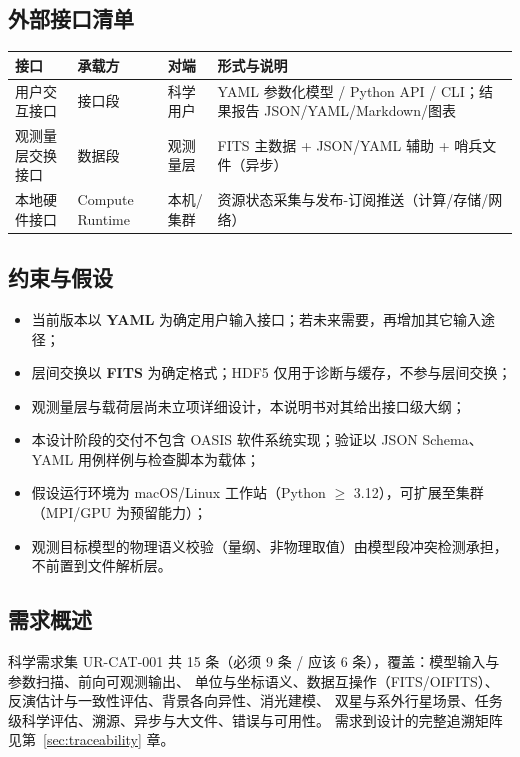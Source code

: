 \subsection{外部接口清单}

\begin{center}
\begin{tabular}{p{3.2cm}p{2.2cm}p{2.8cm}p{6.4cm}}
\toprule
接口 & 承载方 & 对端 & 形式与说明 \\
\midrule
用户交互接口 & 接口段 & 科学用户 & YAML 参数化模型 / Python API / CLI；结果报告 JSON/YAML/Markdown/图表 \\
观测量层交换接口 & 数据段 & 观测量层 & FITS 主数据 + JSON/YAML 辅助 + 哨兵文件（异步） \\
本地硬件接口 & Compute Runtime & 本机/集群 & 资源状态采集与发布-订阅推送（计算/存储/网络） \\
\bottomrule
\end{tabular}
\end{center}

\subsection{约束与假设}
\label{sec:constraints}

\begin{itemize}
  \item 当前版本以 \textbf{YAML} 为确定用户输入接口；若未来需要，再增加其它输入途径；
  \item 层间交换以 \textbf{FITS} 为确定格式；HDF5 仅用于诊断与缓存，不参与层间交换；
  \item 观测量层与载荷层尚未立项详细设计，本说明书对其给出接口级大纲；
  \item 本设计阶段的交付不包含 OASIS 软件系统实现；验证以 JSON Schema、YAML 用例样例与检查脚本为载体；
  \item 假设运行环境为 macOS/Linux 工作站（Python $\geq$ 3.12），可扩展至集群（MPI/GPU 为预留能力）；
  \item 观测目标模型的物理语义校验（量纲、非物理取值）由模型段冲突检测承担，不前置到文件解析层。
\end{itemize}

\subsection{需求概述}

科学需求集 UR-CAT-001 共 15 条（必须 9 条 / 应该 6 条），覆盖：模型输入与参数扫描、前向可观测输出、
单位与坐标语义、数据互操作（FITS/OIFITS）、反演估计与一致性评估、背景各向异性、消光建模、
双星与系外行星场景、任务级科学评估、溯源、异步与大文件、错误与可用性。
需求到设计的完整追溯矩阵见第~\ref{sec:traceability} 章。
